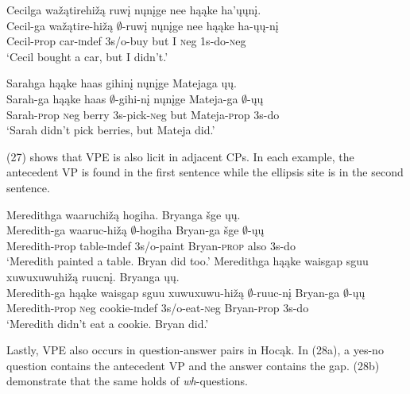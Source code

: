 \documentclass[output=paper]{LSP/langsci}
\begin{document}
\begin{exe}
\ex
\begin{xlist}
\ex
\glll Cecilga wažątirehižą ruwį nųnįge nee hąąke ha'ųųnį.\\
Cecil-ga wažątire-hižą $\emptyset$-ruwį nųnįge nee hąąke ha-ųų-nį\\
Cecil-{\textsc prop} car-{\textsc indef} {\textsc 3s/o}-buy but I {\textsc neg} {\textsc 1s}-do-{\textsc neg}\\
\trans `Cecil bought a car, but I didn't.'

\ex
\glll Sarahga hąąke haas gihinį nųnįge Matejaga ųų.\\
Sarah-ga hąąke haas $\emptyset$-gihi-nį nųnįge Mateja-ga $\emptyset$-ųų\\
Sarah-{\textsc prop} {\textsc neg} berry {\textsc 3s}-pick-{\textsc neg} but Mateja-{\textsc prop} {\textsc 3s}-do\\
\trans `Sarah didn't pick berries, but Mateja did.'
\end{xlist}
\end{exe}


(27) shows that VPE is also licit in adjacent CPs. In each example, the antecedent VP is found in the first sentence while the ellipsis site is in the second sentence.

\begin{exe}
\ex
\begin{xlist}
\ex
\glll Meredithga waaruchižą hogiha. Bryanga šge ųų.\\
Meredith-ga waaruc-hižą $\emptyset$-hogiha Bryan-ga šge $\emptyset$-ųų\\
Meredith-{\textsc prop} table-{\textsc indef} {\textsc 3s/o}-paint Bryan-\textsc{prop} also {\textsc 3s}-do\\
\trans `Meredith painted a table. Bryan did too.'
\ex
\glll Meredithga hąąke {waisgap sguu xuwuxuwuhižą} ruucnį. Bryanga ųų.\\
Meredith-ga hąąke {waisgap sguu xuwuxuwu-hižą} $\emptyset$-ruuc-nį Bryan-ga $\emptyset$-ųų\\
Meredith-{\textsc prop} {\textsc neg} cookie-{\textsc indef} {\textsc 3s/o}-eat-{\textsc neg} Bryan-{\textsc prop} {\textsc 3s}-do\\
\trans `Meredith didn't eat a cookie. Bryan did.'
\end{xlist}
\end{exe}

Lastly, VPE also occurs in question-answer pairs in Hocąk. In (28a), a yes-no question contains the antecedent VP and the answer contains the gap. (28b) demonstrate that the same holds of \emph{wh}-questions.
\end{document}
